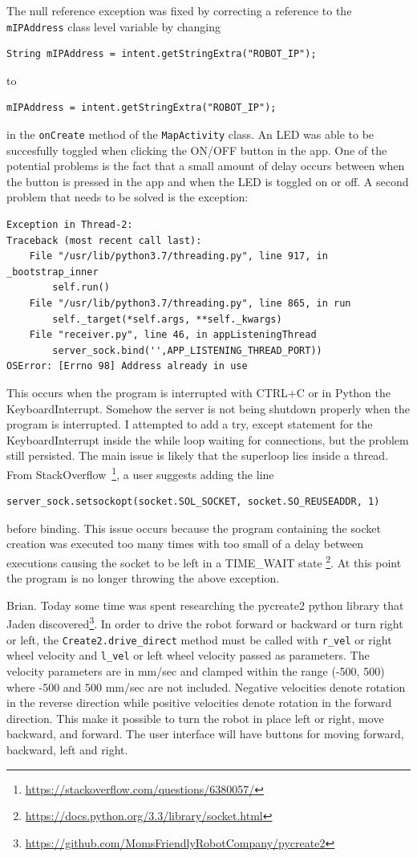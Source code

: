 \documentclass[fontsize=11pt, %
                             paper=a4, %
                             twoside, %
                             captions=tableheading,
                             index=totoc,
                             hyperref]{labbook}
\begin{document}
\begin{addmargin}[0cm]{0cm}
The null reference exception was fixed by correcting a reference to the \texttt{mIPAddress} class level variable by changing 
\begin{Verbatim}
String mIPAddress = intent.getStringExtra("ROBOT_IP");
\end{Verbatim}
to 
\begin{Verbatim}
mIPAddress = intent.getStringExtra("ROBOT_IP");
\end{Verbatim}
in the \texttt{onCreate} method of the \texttt{MapActivity} class. An LED was able to be succesfully toggled when clicking the ON/OFF button in the app. One of the potential problems is the fact that a small amount of delay occurs between when the button is pressed in the app and when the LED is toggled on or off. A second problem that needs to be solved is the exception:
\begin{Verbatim}[tabsize=4]
Exception in Thread-2:
Traceback (most recent call last):
	File "/usr/lib/python3.7/threading.py", line 917, in _bootstrap_inner
		self.run()
	File "/usr/lib/python3.7/threading.py", line 865, in run
		self._target(*self.args, **self._kwargs)
	File "receiver.py", line 46, in appListeningThread
		server_sock.bind('',APP_LISTENING_THREAD_PORT))
OSError: [Errno 98] Address already in use
\end{Verbatim}
This occurs when the program is interrupted with CTRL+C or in Python the KeyboardInterrupt. Somehow the server is not being shutdown properly when the program is interrupted. I attempted to add a try, except statement for the KeyboardInterrupt inside the while loop waiting for connections, but the problem still persisted. The main issue is likely that the superloop lies inside a thread. From StackOverflow~\footnote{\url{https://stackoverflow.com/questions/6380057/}}, a user suggests adding the line
\begin{Verbatim}
server_sock.setsockopt(socket.SOL_SOCKET, socket.SO_REUSEADDR, 1)
\end{Verbatim}
before binding. This issue occurs because the program containing the socket creation was executed too many times with too small of a delay between executions causing the socket to be left in a TIME\_WAIT state \footnote{\url{https://docs.python.org/3.3/library/socket.html}}. At this point the program is no longer throwing the above exception.

Brian. Today some time was spent researching the pycreate2 python library that Jaden discovered\footnote{\url{https://github.com/MomsFriendlyRobotCompany/pycreate2}}. In order to drive the robot forward or backward or turn right or left, the \texttt{Create2.drive\_direct} method must be called with \texttt{r\_vel} or right wheel velocity and \texttt{l\_vel} or left wheel velocity passed as parameters. The velocity parameters are in mm/sec and clamped within the range (-500, 500) where -500 and 500 mm/sec are not included. Negative velocities denote rotation in the reverse direction while positive velocities denote rotation in the forward direction. This make it possible to turn the robot in place left or right, move backward, and forward. The user interface will have buttons for moving forward, backward, left and right. 


\end{addmargin}
\end{document}
